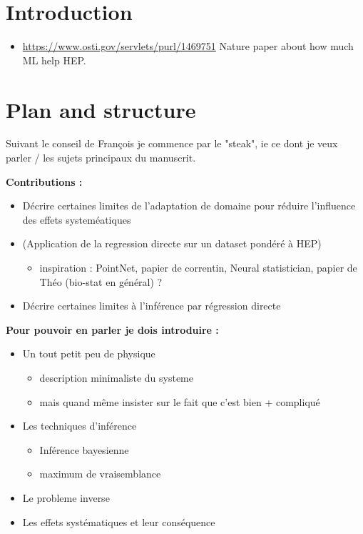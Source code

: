 \section{Introduction} %
\label{sec:introduction}

\begin{itemize}
	\item \url{https://www.osti.gov/servlets/purl/1469751} Nature paper about how much ML help HEP.
\end{itemize}


\section{Plan and structure} %
\label{sec:plan_and_structure}

Suivant le conseil de François je commence par le "steak", ie ce dont je veux parler / les sujets principaux du manuscrit.

\textbf{Contributions :}
\begin{itemize}
    \item Décrire certaines limites de l'adaptation de domaine pour réduire l'influence des effets systeméatiques
    \item (Application de la regression directe sur un dataset pondéré à HEP)
    \begin{itemize}
        \item inspiration : PointNet, papier de correntin, Neural statistician, papier de Théo (bio-stat en général) ?
    \end{itemize}
    \item Décrire certaines limites à l'inférence par régression directe
\end{itemize}


\textbf{Pour pouvoir en parler je dois introduire :}
\begin{itemize}
    \item Un tout petit peu de physique
    \begin{itemize}
        \item description minimaliste du systeme
        \item mais quand même insister sur le fait que c'est bien + compliqué
    \end{itemize}
    \item Les techniques d'inférence
    \begin{itemize}
        \item Inférence bayesienne
        \item maximum de vraisemblance
    \end{itemize}
    \item Le probleme inverse
    \item Les effets systématiques et leur conséquence
\end{itemize}

